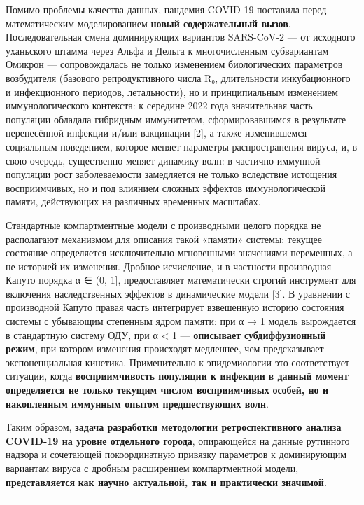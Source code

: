 \documentclass[12pt]{article}
\begin{document}
Помимо проблемы качества данных, пандемия COVID-19 поставила перед
математическим моделированием \textbf{новый содержательный вызов}.
Последовательная смена доминирующих вариантов SARS-CoV-2 --- от
исходного уханьского штамма через Альфа и Дельта к многочисленным
субвариантам Омикрон --- сопровождалась не только изменением
биологических параметров возбудителя (базового репродуктивного числа R₀,
длительности инкубационного и инфекционного периодов, летальности), но и
принципиальным изменением иммунологического контекста: к середине 2022
года значительная часть популяции обладала гибридным иммунитетом,
сформировавшимся в результате перенесённой инфекции и/или вакцинации
{[}2{]}, а также изменившемся социальным поведением, которое меняет
параметры распространения вируса, и, в свою очередь, существенно меняет
динамику волн: в частично иммунной популяции рост заболеваемости
замедляется не только вследствие истощения восприимчивых, но и под
влиянием сложных эффектов иммунологической памяти, действующих на
различных временных масштабах.

Стандартные компартментные модели с производными целого порядка не
располагают механизмом для описания такой «памяти» системы: текущее
состояние определяется исключительно мгновенными значениями переменных,
а не историей их изменения. Дробное исчисление, и в частности
производная Капуто порядка α ∈ (0, 1{]}, предоставляет математически
строгий инструмент для включения наследственных эффектов в динамические
модели {[}3{]}. В уравнении с производной Капуто правая часть
интегрирует взвешенную историю состояния системы с убывающим степенным
ядром памяти: при α → 1 модель вырождается в стандартную систему ОДУ,
при α \textless{} 1 --- \textbf{описывает} \textbf{субдиффузионный
режим}, при котором изменения происходят медленнее, чем предсказывает
экспоненциальная кинетика. Применительно к эпидемиологии это
соответствует ситуации, когда \textbf{восприимчивость популяции к
инфекции} \textbf{в данный момент определяется не только текущим числом
восприимчивых} \textbf{особей, но и накопленным иммунным опытом
предшествующих волн}.

Таким образом, \textbf{задача разработки методологии ретроспективного
анализа} \textbf{COVID-19 на уровне отдельного города}, опирающейся на
данные рутинного надзора и сочетающей покоординатную привязку параметров
к доминирующим вариантам вируса с дробным расширением компартментной
модели, \textbf{представляется} \textbf{как научно актуальной, так и
практически значимой}.

\begin{center}\rule{0.5\linewidth}{0.5pt}\end{center}
\end{document}
